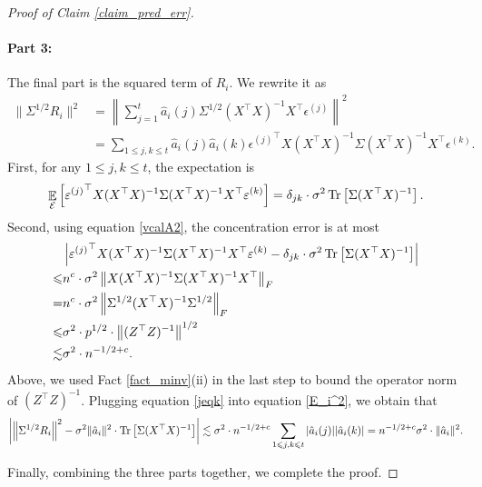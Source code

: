 \begin{proof}[Proof of Claim \ref{claim_pred_err}]
	\paragraph{Part 3:} The final part is the squared term of $R_i$. We rewrite it as
	\begin{align}
	\|\Sigma^{1/2}R_i\|^2 &= \left\|\sum_{j=1}^t \hat{a}_i(j) \Sigma^{1/2}(X^{\top} X)^{-1} X^{\top} \epsilon^{(j)}\right\|^2 \nonumber\\
	& = \sum_{1\le j , k \le t}\hat a_i(j) \hat a_i(k)  {\epsilon^{(j)}}^\top X(X^{\top} X)^{-1}\Sigma (X^{\top} X)^{-1} X^{\top} {\epsilon^{(k)}}.\label{E_i^2}
	\end{align}	
	First, for any $1 \le j, k \le t$, the expectation is
	$$\mathop{\mathbb{E}}_{\mathcal E}\left[ {\varepsilon^{(j)}}^\top X(X^{\top} X)^{-1}\Sigma (X^{\top} X)^{-1} X^{\top} \varepsilon^{(k)} \right]=\delta_{jk}\cdot \sigma^2\operatorname{Tr}\left[\Sigma(X^\top X)^{-1}\right] .$$
	Second, using equation \eqref{vcalA2}, the concentration error is at most
	\begin{align}
	& \left|{\varepsilon^{(j)}}^\top X(X^{\top} X)^{-1}\Sigma (X^{\top} X)^{-1} X^{\top} {\varepsilon^{(k)}} -\delta_{jk}\cdot \sigma^2\operatorname{Tr}\left[\Sigma(X^\top X)^{-1}\right]\right|\nonumber \\
	\leqslant &n^c\cdot \sigma^2  \left\| X(X^{\top} X)^{-1}\Sigma (X^{\top} X)^{-1} X^{\top}  \right\|_{F} \nonumber \\
	 = & n^c\cdot \sigma^2  \left\| \Sigma^{1/2}(X^{\top} X)^{-1}\Sigma^{1/2} \right\|_{F} \nonumber\\
	  \leqslant &\sigma^2 \cdot p^{1/2} \cdot  \left\| (Z^{\top} Z)^{-1} \right\|^{1/2} \nonumber\\
	  \lesssim &\sigma^2 \cdot n^{-1/2+c}. \label{jeqk}
	\end{align}
	Above, we used Fact \ref{fact_minv}(ii) in the last step to bound the operator norm of $(Z^{\top} Z)^{-1}$.
	Plugging equation \eqref{jeqk} into equation \eqref{E_i^2}, we obtain that 
	\begin{align*}
		{\left| {\left\| \Sigma^{1/2} R_i \right\|^2 -  \sigma^2 \|\hat a_i\|^2 \cdot\operatorname{Tr}\left[\Sigma(X^\top X)^{-1}\right]} \right|} \lesssim  \sigma^2 \cdot n^{-1/2+c}  \sum_{1\leqslant j,k\leqslant t}|\hat a_i(j)||\hat a_i(k)| =  n^{-1/2+c} \sigma^2 \cdot  \|\hat a_i\|^2.
	\end{align*}

	Finally, combining the three parts together, we complete the proof.
\end{proof}
